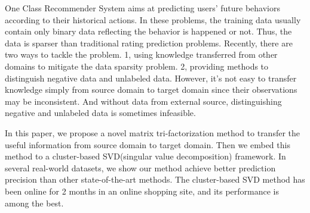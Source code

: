 One Class Recommender System aims at predicting users' future behaviors according to their historical actions. In these problems, the training data usually contain only binary data reflecting the behavior is happened or not. Thus, the data is sparser than traditional rating prediction problems.
Recently, there are two ways to tackle the problem. 1, using knowledge transferred from other domains to mitigate the data sparsity problem. 2, providing methods to distinguish negative data and unlabeled data.
However, it's not easy to transfer knowledge simply from source domain to target domain since their observations may be inconsistent. And without data from external source, distinguishing negative and unlabeled data is sometimes infeasible.

In this paper, we propose a novel matrix tri-factorization method to transfer the useful information from source domain to target domain. Then we embed this method to a cluster-based SVD(singular value decomposition) framework.
In several real-world datasets, we show our method achieve better prediction precision than other state-of-the-art methods. The cluster-based SVD method has been online for 2 months in an online shopping site, and its performance is among the best.
